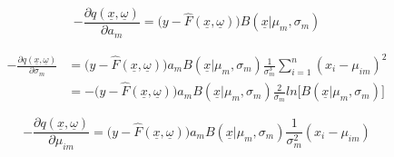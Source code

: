 \documentclass[11pt]{article}
\begin{document}
 \begin{equation}
 - \frac{\partial q(\underline{x}, \underline{\omega})}{\partial a_m} = \Big(y - \hat{F}(\underline{x}, \underline{\omega}) \Big)B(\underline{x}|\mu_m, \sigma_m) 
 \end{equation}
 

\begin{equation}
\begin{split}
 - \frac{\partial q(\underline{x}, \underline{\omega})}{\partial \sigma_m} & = \Big(y - \hat{F}(\underline{x}, \underline{\omega}) \Big) a_m B(\underline{x}|\mu_m, \sigma_m) \frac{1}{\sigma_m^3} \sum_{i = 1}^{n}(x_i - \mu_{im})^2\\ & = -\Big(y - \hat{F}(\underline{x}, \underline{\omega}) \Big) a_m B(\underline{x}|\mu_m, \sigma_m) \frac{2}{\sigma_m} ln \bigg[B(\underline{x}|\mu_m, \sigma_m) \bigg]
 \end{split}
 \end{equation}
 
 \begin{equation}
 - \frac{\partial q(\underline{x}, \underline{\omega})}{\partial \mu_{im}} = \Big(y - \hat{F}(\underline{x}, \underline{\omega}) \Big) a_m B(\underline{x}|\mu_m, \sigma_m) \frac{1}{\sigma_m^2}(x_i - \mu_{im})
 \end{equation}


\vspace{5 mm}
\noindent
\end{document}
